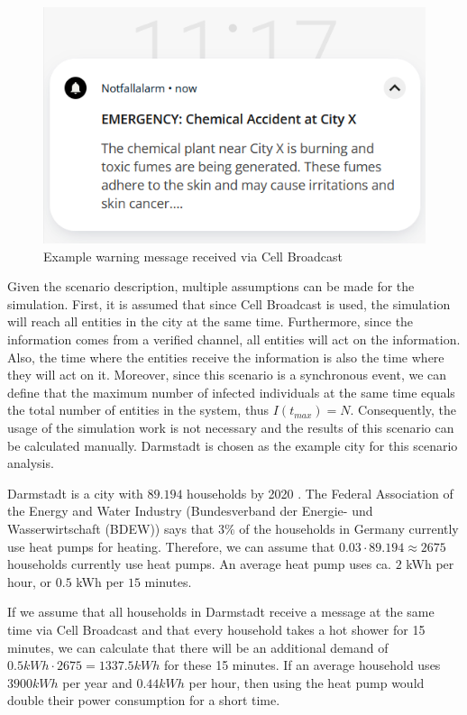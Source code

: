 \begin{figure}[!ht]
    \center
    \includegraphics[scale=.7]{figs/emergencychemical.png}
    \caption{Example warning message received via Cell Broadcast}
    \label{warningmessage}
\end{figure}

Given the scenario description, multiple assumptions can be
made for the simulation.
First, it is assumed that since Cell Broadcast is used, the simulation
will reach all entities in the city at the same time.
Furthermore, since the information comes from a verified channel,
all entities will act on the information. Also, the time where the
entities receive the information is also the time where they will act
on it.
Moreover, since this scenario is a synchronous event, we can define that the
maximum number of infected individuals at the same time equals
the total number of entities in the system, thus $I(t_{max})=N$.
Consequently, the usage of the simulation work is not necessary
and the results of this scenario can be calculated manually.
Darmstadt is chosen as the example city for this scenario analysis.

Darmstadt is a city with $89.194$ households by 2020 
\cite{statistadarmstadt}. The 
Federal Association of the Energy and Water Industry
(Bundesverband der Energie- und Wasserwirtschaft (BDEW)) 
says that $3\%$ of the households in Germany currently use
heat pumps for heating. Therefore, we can assume that 
$0.03 \cdot 89.194 \approx 2675$ households currently use 
heat pumps. An average heat pump uses ca. $2$ kWh per hour, 
or $0.5$ kWh per $15$ minutes.

If we assume that all households in Darmstadt receive 
a message at the same time via Cell Broadcast and that
every household takes a hot shower for 15 minutes,
we can calculate that there will be an additional 
demand of $0.5kWh \cdot 2675 = 1337.5 kWh $ for these 
15 minutes. If an average household uses $3900 kWh$ 
per year and $0.44kWh$ per hour, then using the heat pump 
would double their power consumption for a short time.

